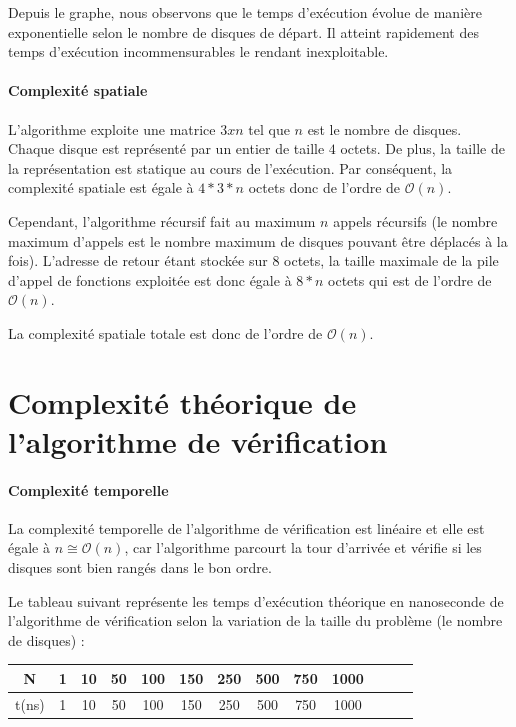 Depuis le graphe, nous observons que le temps d'exécution évolue de manière exponentielle selon le nombre de disques de départ. Il atteint rapidement des temps d'exécution incommensurables le rendant inexploitable.

\paragraph{Complexité spatiale}
L'algorithme exploite une matrice $3 x n$ tel que $n$ est le nombre de disques. Chaque disque est représenté par un entier de taille $4$ octets. De plus, la taille de la représentation est statique au cours de l'exécution. Par conséquent, la complexité spatiale est égale à $4 * 3 * n$ octets donc de l'ordre de $\mathcal{O}(n)$.
\par
Cependant, l'algorithme récursif fait au maximum $n$ appels récursifs (le nombre maximum d'appels est le nombre maximum de disques pouvant être déplacés à la fois). L'adresse de retour étant stockée sur $8$ octets, la taille maximale de la pile d'appel de fonctions exploitée est donc égale à $8 * n$ octets qui est de l'ordre de $\mathcal{O}(n)$.
\par
La complexité spatiale totale est donc de l'ordre de $\mathcal{O}(n)$.

\section{Complexité théorique de l'algorithme de vérification}
\paragraph{Complexité temporelle}
La complexité temporelle de l'algorithme de vérification est linéaire et elle est égale à $n \cong \mathcal{O}(n)$, car l'algorithme parcourt la tour d'arrivée et vérifie si les disques sont bien rangés dans le bon ordre.
\par
Le tableau suivant représente les temps d'exécution théorique en nanoseconde de l'algorithme de vérification selon la variation de la taille du problème (le nombre de disques) :

\small
\begin{center}
    \begin{tabular}{| c | c | c | c | c | c | c | c | c | c | c | c | c |}
        \hline
        N & 1 & 10 & 50 & 100 & 150 & 250 & 500 & 750 & 1000\\
        \hline
        t(ns) & 1 & 10 & 50 & 100 & 150 & 250 & 500 & 750 & 1000\\
        \hline
    \end{tabular}
\end{center}

